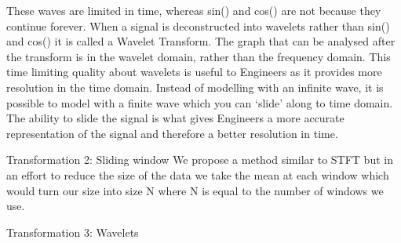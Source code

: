 \documentclass{turabian-thesis}
\begin{document}
These waves are limited in time, whereas sin() and cos() are not because they continue forever. When a signal is deconstructed into wavelets rather than sin() and cos() it is called a Wavelet Transform. The graph that can be analysed after the transform is in the wavelet domain, rather than the frequency domain.
This time limiting quality about wavelets is useful to Engineers as it provides more resolution in the time domain. Instead of modelling with an infinite wave, it is possible to model with a finite wave which you can ‘slide’ along to time domain. The ability to slide the signal is what gives Engineers a more accurate representation of the signal and therefore a better resolution in time.



Transformation 2: Sliding window 
We propose a method similar to STFT but in an effort to reduce the size of the data we take the mean at each window which would turn our size into size N where N is equal to the number of windows we use.



Transformation 3: Wavelets



\end{document}
